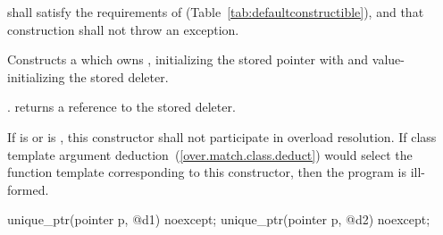 \begin{itemdescr}
\pnum
\requires {} shall
satisfy the requirements of  (Table~\ref{tab:defaultconstructible}),
and that construction shall not throw an exception.

\pnum
\effects Constructs a  which owns
, initializing the stored pointer with  and
value-initializing the stored deleter.

\pnum
\postconditions {}. 
returns a reference to the stored deleter.

\pnum
\remarks If  is  or
 is ,
this constructor shall not participate in overload resolution.
If class template argument deduction~(\ref{over.match.class.deduct})
would select the function template corresponding to this constructor,
then the program is ill-formed.
\end{itemdescr}

%
\begin{itemdecl}
unique_ptr(pointer p, @\seebelow@ d1) noexcept;
unique_ptr(pointer p, @\seebelow@ d2) noexcept;
\end{itemdecl}

